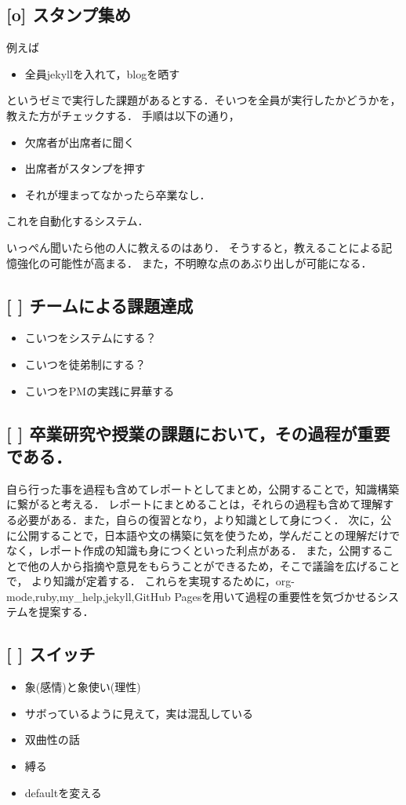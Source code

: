 \documentclass{jsarticle}
\begin{document}
\subsection{[o] スタンプ集め}
\label{sec:org06d10dc}
例えば
\begin{itemize}
\item 全員jekyllを入れて，blogを晒す
\end{itemize}
というゼミで実行した課題があるとする．そいつを全員が実行したかどうかを，教えた方がチェックする．
手順は以下の通り，
\begin{itemize}
\item 欠席者が出席者に聞く
\item 出席者がスタンプを押す
\item それが埋まってなかったら卒業なし．
\end{itemize}
これを自動化するシステム．

いっぺん聞いたら他の人に教えるのはあり．
そうすると，教えることによる記憶強化の可能性が高まる．
また，不明瞭な点のあぶり出しが可能になる．

\subsection{[ ] チームによる課題達成}
\label{sec:orgb22b881}
\begin{itemize}
\item こいつをシステムにする？
\item こいつを徒弟制にする？
\item こいつをPMの実践に昇華する
\end{itemize}
\subsection{[ ] 卒業研究や授業の課題において，その過程が重要である．}
\label{sec:orgcf0d253}
自ら行った事を過程も含めてレポートとしてまとめ，公開することで，知識構築に繋がると考える．
レポートにまとめることは，それらの過程も含めて理解する必要がある．また，自らの復習となり，より知識として身につく．
次に，公に公開することで，日本語や文の構築に気を使うため，学んだことの理解だけでなく，レポート作成の知識も身につくといった利点がある．
また，公開することで他の人から指摘や意見をもらうことができるため，そこで議論を広げることで，
より知識が定着する．
これらを実現するために，org-mode,ruby,my\_help,jekyll,GitHub Pagesを用いて過程の重要性を気づかせるシステムを提案する．

\subsection{[ ] スイッチ}
\label{sec:org9fdd30f}
\begin{itemize}
\item 象(感情)と象使い(理性)
\item サボっているように見えて，実は混乱している
\item 双曲性の話
\item 縛る
\item defaultを変える
\end{itemize}
\end{document}
